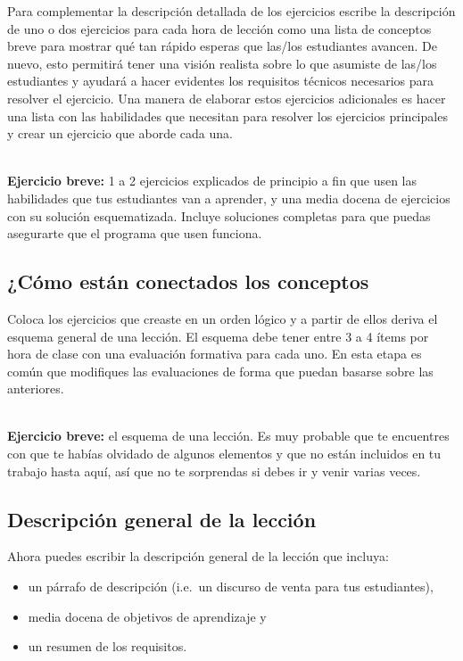 Para complementar la descripción detallada de los ejercicios
escribe la descripción de uno o dos ejercicios para cada hora de lección como una lista de conceptos breve
para mostrar qué tan rápido esperas que las/los estudiantes avancen.
De nuevo, 
esto permitirá tener una visión realista sobre lo que asumiste de las/los estudiantes
y ayudará a hacer evidentes los requisitos técnicos necesarios para resolver el ejercicio.
Una manera de elaborar estos ejercicios adicionales
es hacer una lista con las habilidades que necesitan para resolver los ejercicios principales
y crear un ejercicio que aborde cada una.

~\\
\noindent
\textbf{Ejercicio breve:} 1 a 2 ejercicios explicados de principio a fin
que usen las habilidades que tus estudiantes van a aprender,
y una media docena de ejercicios con su solución esquematizada.
Incluye soluciones completas
para que puedas asegurarte que el programa que usen funciona.

\subsection*{¿Cómo están conectados los conceptos}

Coloca los ejercicios que creaste en un orden lógico
y a partir de ellos deriva el esquema general de una lección.
El esquema debe tener entre 3 a 4 ítems por hora de clase
con una evaluación formativa para cada uno.
En esta etapa es común que modifiques las evaluaciones
de forma que puedan basarse sobre las anteriores.

~\\
\noindent
\textbf{Ejercicio breve:} el esquema de una lección.
Es muy probable que te encuentres con que te habías olvidado de algunos elementos y que no están incluidos en tu trabajo hasta aquí,
así que no te sorprendas si debes ir y venir varias veces.

\subsection*{Descripción general de la lección}

Ahora puedes escribir la descripción general de la lección que incluya:

\begin{itemize}

\item
  un párrafo de descripción (i.e.\ un discurso de venta para tus estudiantes),

\item
  media docena de objetivos de aprendizaje y

\item
  un resumen de los requisitos.

\end{itemize}

